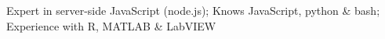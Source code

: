 \item Expert in server-side JavaScript (node.js); Knows JavaScript, python \& bash; Experience with R, MATLAB \& LabVIEW
